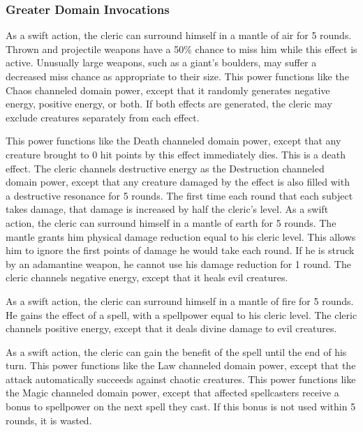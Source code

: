 \subsubsection{Greater Domain Invocations}\label{Greater Domain Invocations}

As a swift action, the cleric can surround himself in a mantle of air for 5 rounds.
Thrown and projectile weapons have a 50\% chance to miss him while this effect is active.
Unusually large weapons, such as a giant's boulders, may suffer a decreased miss chance as appropriate to their size.
This power functions like the Chaos channeled domain power, except that it randomly generates negative energy, positive energy, or both.
If both effects are generated, the cleric may exclude creatures separately from each effect.

This power functions like the Death channeled domain power, except that any creature brought to 0 hit points by this effect immediately dies.
This is a death effect.
The cleric channels destructive energy as the Destruction channeled domain power, except that any creature damaged by the effect is also filled with a destructive resonance for 5 rounds.
The first time each round that each subject takes damage, that damage is increased by half the cleric's level.
As a swift action, the cleric can surround himself in a mantle of earth for 5 rounds.
The mantle grants him physical damage reduction equal to his cleric level.
This allows him to ignore the first points of damage he would take each round.
If he is struck by an adamantine weapon, he cannot use his damage reduction for 1 round.
The cleric channels negative energy, except that it heals evil creatures.

As a swift action, the cleric can surround himself in a mantle of fire for 5 rounds.
He gains the effect of a  spell, with a spellpower equal to his cleric level.
The cleric channels positive energy, except that it deals divine damage to evil creatures.

 As a swift action, the cleric can gain the benefit of the 
spell until the end of his turn.
This power functions like the Law channeled domain power, except that the attack automatically succeeds against chaotic creatures.
This power functions like the Magic channeled domain power, except that affected spellcasters receive a  bonus to spellpower on the next spell they cast.
If this bonus is not used within 5 rounds, it is wasted.

